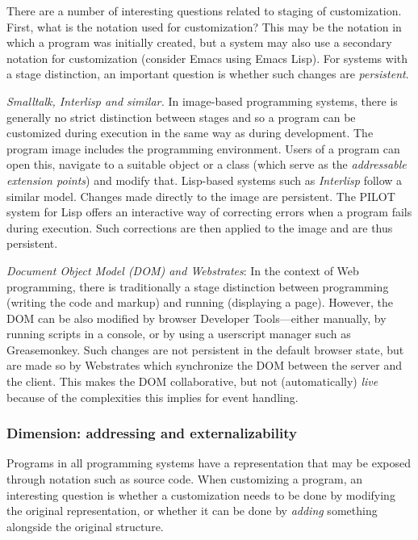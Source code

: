 There are a number of interesting questions related to staging of
customization. First, what is the notation used for customization? This
may be the notation in which a program was initially created, but a
system may also use a secondary notation for customization (consider
Emacs using Emacs Lisp). For systems with a stage distinction, an
important question is whether such changes are \emph{persistent}.

\emph{Smalltalk, Interlisp and similar.} In image-based programming
systems, there is generally no strict distinction between stages and so
a program can be customized during execution in the same way as during
development. The program image includes the programming environment.
Users of a program can open this, navigate to a suitable object or a
class (which serve as the \emph{addressable extension points}) and
modify that. Lisp-based systems such as \emph{Interlisp} follow a
similar model. Changes made directly to the image are persistent. The
PILOT system for Lisp \cite{Pilot} offers an interactive way of
correcting errors when a program fails during execution. Such
corrections are then applied to the image and are thus persistent.

\emph{Document Object Model (DOM) and Webstrates}: In the context of Web
programming, there is traditionally a stage distinction between
programming (writing the code and markup) and running (displaying a
page). However, the DOM can be also modified by browser Developer
Tools---either manually, by running scripts in a console, or by using a
userscript manager such as Greasemonkey. Such changes are not persistent
in the default browser state, but are made so by Webstrates
\cite{Webstrates} which synchronize the DOM between the server and the
client. This makes the DOM collaborative, but not (automatically)
\emph{live} because of the complexities this implies for event handling.

\hypertarget{dimension-addressing-and-externalizability}{%
\subsubsection{Dimension: addressing and
externalizability}\label{dimension-addressing-and-externalizability}}

Programs in all programming systems have a representation that may be
exposed through notation such as source code. When customizing a
program, an interesting question is whether a customization needs to be
done by modifying the original representation, or whether it can be done
by \emph{adding} something alongside the original structure.

